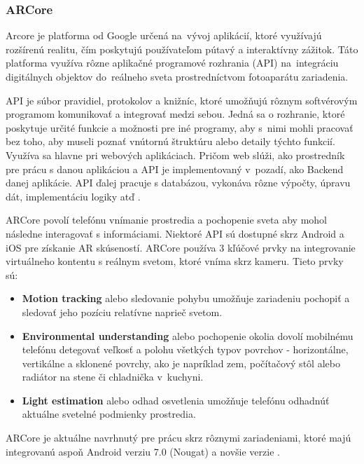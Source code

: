 \subsubsection{ARCore}

Arcore je platforma od Google určená na~vývoj aplikácií, ktoré využívajú rozšírenú realitu, čím poskytujú používateľom pútavý a interaktívny zážitok. Táto platforma využíva rôzne aplikačné programové rozhrania (API) na~integráciu digitálnych objektov do~reálneho sveta prostredníctvom fotoaparátu zariadenia. %

API je súbor pravidiel, protokolov a knižníc, ktoré umožňujú rôznym softvérovým programom komunikovať a integrovať medzi sebou. Jedná sa o rozhranie, ktoré poskytuje určité funkcie a možnosti pre iné programy, aby s~nimi mohli pracovať bez toho, aby museli poznať vnútornú štruktúru alebo detaily týchto funkcií. Využíva sa hlavne pri webových aplikáciach. Pričom web slúži, ako prostredník pre prácu s danou aplikáciou a API je implementovaný v~pozadí, ako Backend danej aplikácie. API ďalej pracuje s databázou, vykonáva rôzne výpočty, úpravu dát, implementáciu logiky atď \cite{kodouskova2020api}. 

ARCore povolí telefónu vnímanie prostredia a pochopenie sveta aby mohol následne interagovať s informáciami. Niektoré API sú dostupné skrz Android a iOS pre získanie AR skúseností. ARCore používa 3 kľúčové prvky na integrovanie virtuálneho kontentu s reálnym svetom, ktoré vníma skrz kameru. Tieto prvky sú:

\begin{itemize}
    \item \textbf{Motion tracking} alebo sledovanie pohybu umožňuje zariadeniu pochopiť a sledovať jeho pozíciu relatívne naprieč svetom.
    
    \item \textbf{Environmental understanding} alebo pochopenie okolia dovolí mobilnému telefónu detegovať veľkosť a polohu všetkých typov povrchov - horizontálne, vertikálne a sklonené povrchy, ako je napríklad zem, počítačový stôl alebo radiátor na stene či chladnička v~kuchyni.
    
    \item \textbf{Light estimation} alebo odhad osvetlenia umožňuje telefónu odhadnúť aktuálne svetelné podmienky prostredia.
\end{itemize}


ARCore je aktuálne navrhnutý pre prácu skrz rôznymi zariadeniami, ktoré majú integrovanú aspoň Android verziu 7.0 (Nougat) a novšie verzie \cite{google2024arcore}. 

